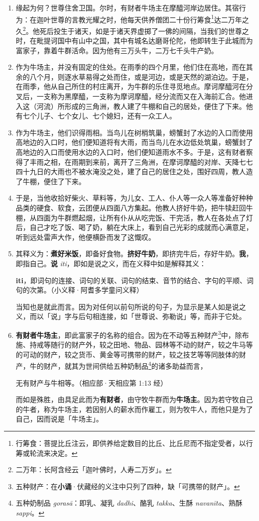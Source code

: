 \begin{enumerate}\item 缘起为何？世尊住舍卫国。尔时，有财者牛场主在摩醯河岸边居住。其宿行为：在迦叶世尊的言教光耀之时，他每天供养僧团二十份行筹食\footnote{行筹食：菩提比丘注云，即供养给定数目的比丘、比丘尼而不指定受者，以行筹或轮流来决定。}达二万年之久\footnote{二万年：长阿含经云「迦叶佛时，人寿二万岁」。}。他死后投生于诸天，如是于诸天界虚掷了一佛的间隔，当我们的世尊之时，在毗提诃国中有山中之国，其中有城名达磨哥伦陀，他即转生于此城而为富家子，靠着牛群活命。因为他有三万头牛，二万七千头牛产奶。
\item 作为牛场主，并没有固定的住处。在雨季的四个月里，他们住在高地，而在其余的八个月，则逐水草易得之处而住，或是河边，或是天然的湖泊边。于是，在雨季，他从自己所住的村庄离开，为牛群的乐住寻觅地点。摩诃摩醯河在分叉后，一支称为黑摩醯，一支称为摩诃摩醯，经分流而又在入海前汇合。他进入这（河流）所形成的三角洲，教人建了牛棚和自己的居处，便住了下来。他有七个儿子、七个女儿、七个媳妇，还有一众工人。
\item 作为牛场主，他们识得雨相。当鸟儿在树梢筑巢，螃蟹封了水边的入口而使用高地边的入口时，他们便知道将有大雨，而当鸟儿在水边低处筑巢，螃蟹封了高地边的入口而使用水边的入口时，他们便知道雨水不多。于是，这有财者察得了丰雨之相，在雨期到来前，离开了三角洲，在摩诃摩醯的对岸、天降七七四十九日的大雨也不被水淹没之处，建了自己的居住之处，围好四周，教人造了牛棚，便住了下来。
\item 于是，当他收拾好柴火、草料等，为儿女、工人、仆人等一众人等准备好种种品类的硬食、软食，云团便从四面八方集起。他教人挤好牛奶，把牛犊赶回牛棚，从四面为牛群燃起烟，让所有仆从从吃完饭、干完活，教人在各处点了灯后，自己才吃了饭、喝了奶，躺在大床上，看到自己光彩的成就而心满意足，听到远处雷声大作，他便横卧而发了这慨叹。
\item 其释义为：\textbf{煮好米饭}，即备好食物。\textbf{挤好牛奶}，即挤完牛后，存好牛奶。\textbf{我}，即指自己。\textbf{说} \textit{iti}，即如是说之义，而在义释中如是解释其义：\begin{quoting}\textbf{iti}，即词句的连接、词句的关联、词句的结束、音节的结合、字句的平顺、词句的次第。（小义释·阿耆多学童问义释）\end{quoting}当知也是就此而言。因为对任何以前句所说的句子，为显示是某人如是说之义，而以「说」字与后句相连接，如「世尊说、弥勒说」等，而非于它处。
\item \textbf{有财者牛场主}，即此富家子的名称的组合。因为在不动等五种财产\footnote{五种财产：在\textbf{小诵}·伏藏经的义注中只列了四种，缺「可携带的财产」。}中，除布施、持戒等随行的财产外，较之田地、物品、园林等不动的财产，较之牛马等的可动的财产，较之货币、黄金等可携带的财产，较之技艺等等同肢体的财产，牛的财产，就其为世间供给五种奶制品\footnote{五种奶制品 \textit{gorasā}：即乳、凝乳 \textit{dadhi}、酪乳 \textit{takka}、生酥 \textit{navanīta}、熟酥 \textit{sappi}。}的诸多助益而言，\begin{quoting}无有财产与牛相等。（相应部·天相应第 1:13 经）\end{quoting}而如是殊胜，由具足此而为\textbf{有财者}，由守牧牛群而为\textbf{牛场主}。因为若守牧自己的牛者，称为牛场主，若因别人的薪水而作雇工，则为牧牛人，而他只是为了自己，因而说是「牛场主」。

\end{enumerate}
